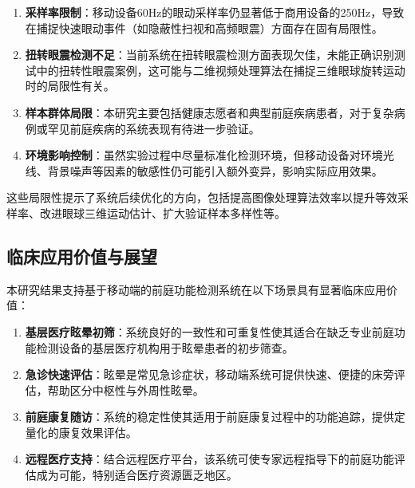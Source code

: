 \begin{enumerate}
  \item \textbf{采样率限制}：移动设备60Hz的眼动采样率仍显著低于商用设备的250Hz，导致在捕捉快速眼动事件（如隐蔽性扫视和高频眼震）方面存在固有局限性。

  \item \textbf{扭转眼震检测不足}：当前系统在扭转眼震检测方面表现欠佳，未能正确识别测试中的扭转性眼震案例，这可能与二维视频处理算法在捕捉三维眼球旋转运动时的局限性有关。

  \item \textbf{样本群体局限}：本研究主要包括健康志愿者和典型前庭疾病患者，对于复杂病例或罕见前庭疾病的系统表现有待进一步验证。

  \item \textbf{环境影响控制}：虽然实验过程中尽量标准化检测环境，但移动设备对环境光线、背景噪声等因素的敏感性仍可能引入额外变异，影响实际应用效果。
\end{enumerate}

这些局限性提示了系统后续优化的方向，包括提高图像处理算法效率以提升等效采样率、改进眼球三维运动估计、扩大验证样本多样性等。

\subsection{临床应用价值与展望}

本研究结果支持基于移动端的前庭功能检测系统在以下场景具有显著临床应用价值：

\begin{enumerate}
  \item \textbf{基层医疗眩晕初筛}：系统良好的一致性和可重复性使其适合在缺乏专业前庭功能检测设备的基层医疗机构用于眩晕患者的初步筛查。

  \item \textbf{急诊快速评估}：眩晕是常见急诊症状，移动端系统可提供快速、便捷的床旁评估，帮助区分中枢性与外周性眩晕。

  \item \textbf{前庭康复随访}：系统的稳定性使其适用于前庭康复过程中的功能追踪，提供定量化的康复效果评估。

  \item \textbf{远程医疗支持}：结合远程医疗平台，该系统可使专家远程指导下的前庭功能评估成为可能，特别适合医疗资源匮乏地区。
\end{enumerate}


